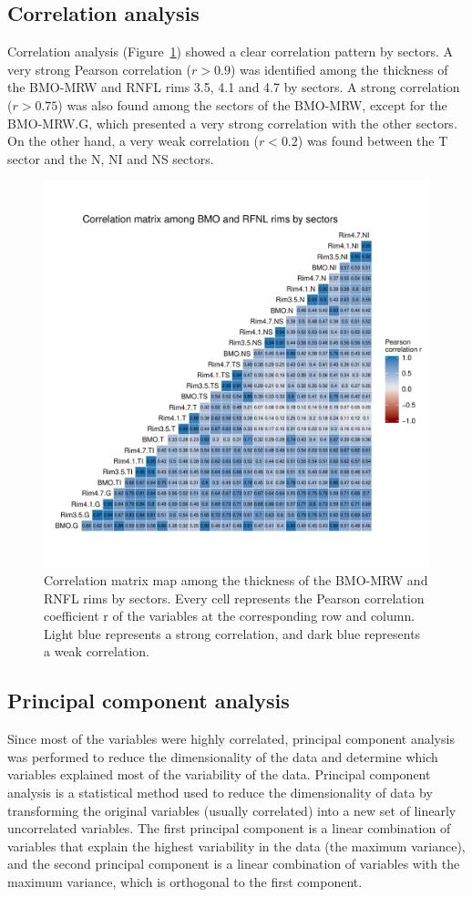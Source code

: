 \documentclass[fleqn,10pt]{wlscirep}
\begin{document}
\subsection*{Correlation analysis}

Correlation analysis (Figure~\ref{fig:correlation}) showed a clear correlation pattern by sectors. A very strong Pearson correlation ($r > 0.9$) was identified among the thickness of the BMO-MRW and RNFL rims 3.5, 4.1 and 4.7 by sectors. A strong correlation ($r > 0.75$) was also found among the sectors of the BMO-MRW, except for the BMO-MRW.G, which presented a very strong correlation with the other sectors. On the other hand, a very weak correlation ($r < 0.2$) was found between the T sector and the N, NI and NS sectors.

\begin{figure}[ht]
\centering
\includegraphics[width=0.5\linewidth]{img/correlation-matrix-bmo-rnfl.pdf}
\caption{Correlation matrix map among the thickness of the BMO-MRW and RNFL rims by sectors. Every cell represents the Pearson correlation coefficient r of the variables at the corresponding row and column. Light blue represents a strong correlation, and dark blue represents a weak correlation.}
\label{fig:correlation}
\end{figure}

\subsection*{Principal component analysis}

Since most of the variables were highly correlated, principal component analysis was performed to reduce the dimensionality of the data and determine which variables explained most of the variability of the data. Principal component analysis is a statistical method used to reduce the dimensionality of data by transforming the original variables (usually correlated) into a new set of linearly uncorrelated variables. The first principal component is a linear combination of variables that explain the highest variability in the data (the maximum variance), and the second principal component is a linear combination of variables with the maximum variance, which is orthogonal to the first component\cite{hassel:2009:}.
\end{document}
